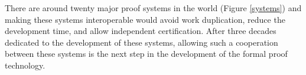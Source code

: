 There are around twenty major proof systems in the world
(Figure \ref{systems}) and making these systems interoperable would avoid work
duplication, reduce the development time, and allow independent
certification.  After three decades dedicated to the development of
these systems, allowing such a cooperation between these systems is
the next step in the development of the formal proof technology.

